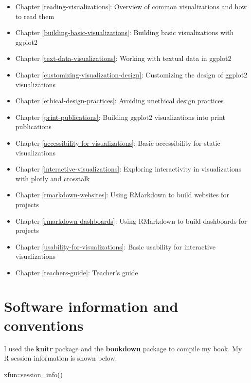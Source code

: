 \documentclass[
]{krantz}
\makeatletter
\newenvironment{Shaded}{\begin{snugshade}}{\end{snugshade}}
\newcommand{\FunctionTok}[1]{\textcolor[rgb]{0,0,0}{#1}}
\newcommand{\NormalTok}[1]{#1}
\newcommand{\SpecialCharTok}[1]{\textcolor[rgb]{0,0,0}{#1}}
\providecommand{\tightlist}{%
  \setlength{\itemsep}{0pt}\setlength{\parskip}{0pt}}
\newenvironment{kframe}{%
\medskip{}
\setlength{\fboxsep}{.8em}
 \def\at@end@of@kframe{}%
 \ifinner\ifhmode%
  \def\at@end@of@kframe{\end{minipage}}%
  \begin{minipage}{\columnwidth}%
 \fi\fi%
 \def\FrameCommand##1{\hskip\@totalleftmargin \hskip-\fboxsep
 \colorbox{shadecolor}{##1}\hskip-\fboxsep
     \hskip-\linewidth \hskip-\@totalleftmargin \hskip\columnwidth}%
 \MakeFramed {\advance\hsize-\width
   \@totalleftmargin\z@ \linewidth\hsize
   \@setminipage}}%
 {\par\unskip\endMakeFramed%
 \at@end@of@kframe}
\renewenvironment{Shaded}{\begin{kframe}}{\end{kframe}}
\makeatother
\begin{document}
\begin{itemize}
\tightlist
\item
  Chapter \ref{reading-visualizations}: Overview of common visualizations and how to read them
\item
  Chapter \ref{building-basic-visualizations}: Building basic visualizations with ggplot2
\item
  Chapter \ref{text-data-visualizations}: Working with textual data in ggplot2
\item
  Chapter \ref{customizing-visualization-design}: Customizing the design of ggplot2 visualizations
\item
  Chapter \ref{ethical-design-practices}: Avoiding unethical design practices
\item
  Chapter \ref{print-publications}: Building ggplot2 visualizations into print publications
\item
  Chapter \ref{accessibility-for-visualizations}: Basic accessibility for static visualizations
\item
  Chapter \ref{interactive-visualizations}: Exploring interactivity in visualizations with plotly and crosstalk
\item
  Chapter \ref{rmarkdown-websites}: Using RMarkdown to build websites for projects
\item
  Chapter \ref{rmarkdown-dashboards}: Using RMarkdown to build dashboards for projects
\item
  Chapter \ref{usability-for-visualizations}: Basic usability for interactive visualizations
\item
  Chapter \ref{teachers-guide}: Teacher's guide
\end{itemize}

\hypertarget{software-information-and-conventions}{%
\section*{Software information and conventions}\label{software-information-and-conventions}}


I used the \textbf{knitr} package \citep{xie2015} and the \textbf{bookdown} package \citep{R-bookdown} to compile my book. My R session information is shown below:

\begin{Shaded}
\begin{Highlighting}[]
\NormalTok{xfun}\SpecialCharTok{::}\FunctionTok{session\_info}\NormalTok{()}
\end{Highlighting}
\end{Shaded}
\end{document}
